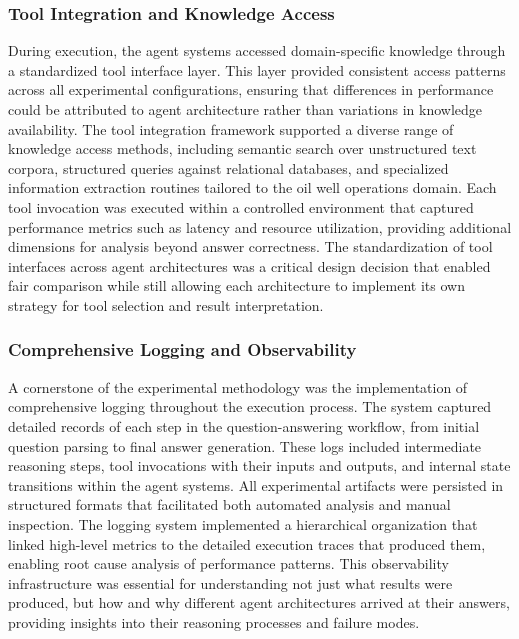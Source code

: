             \subsubsection{Tool Integration and Knowledge Access}

            During execution, the agent systems accessed domain-specific knowledge through a standardized tool interface layer. This layer provided consistent access patterns across all experimental configurations, ensuring that differences in performance could be attributed to agent architecture rather than variations in knowledge availability. The tool integration framework supported a diverse range of knowledge access methods, including semantic search over unstructured text corpora, structured queries against relational databases, and specialized information extraction routines tailored to the oil well operations domain. Each tool invocation was executed within a controlled environment that captured performance metrics such as latency and resource utilization, providing additional dimensions for analysis beyond answer correctness. The standardization of tool interfaces across agent architectures was a critical design decision that enabled fair comparison while still allowing each architecture to implement its own strategy for tool selection and result interpretation.

            \subsubsection{Comprehensive Logging and Observability}

            A cornerstone of the experimental methodology was the implementation of comprehensive logging throughout the execution process. The system captured detailed records of each step in the question-answering workflow, from initial question parsing to final answer generation. These logs included intermediate reasoning steps, tool invocations with their inputs and outputs, and internal state transitions within the agent systems. All experimental artifacts were persisted in structured formats that facilitated both automated analysis and manual inspection. The logging system implemented a hierarchical organization that linked high-level metrics to the detailed execution traces that produced them, enabling root cause analysis of performance patterns. This observability infrastructure was essential for understanding not just what results were produced, but how and why different agent architectures arrived at their answers, providing insights into their reasoning processes and failure modes.

